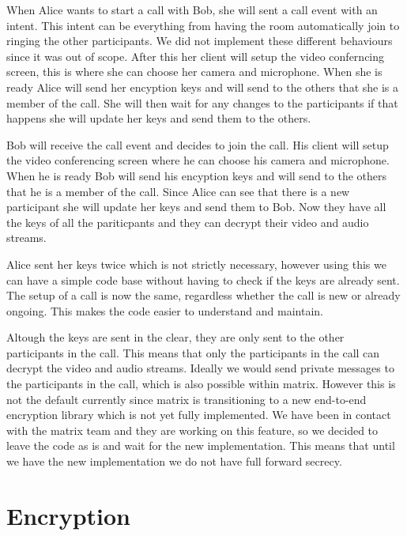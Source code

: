 \documentclass{report}
\begin{document}
    When Alice wants to start a call with Bob, she will sent a call event with an intent. This intent can be
    everything from having the room automatically join to ringing the other participants. We did not implement
    these different behaviours since it was out of scope. After this her client will setup the video conferncing
    screen, this is where she can choose her camera and microphone. When she is ready Alice will send her encyption
    keys and will send to the others that she is a member of the call. She will then wait for any changes to the participants
    if that happens she will update her keys and send them to the others.

    Bob will receive the call event and decides to join the call. His client will setup the video conferencing
    screen where he can choose his camera and microphone. When he is ready Bob will send his encyption keys and will
    send to the others that he is a member of the call. Since Alice can see that there is a new participant she will
    update her keys and send them to Bob. Now they have all the keys of all the pariticpants and they can decrypt their
    video and audio streams.

    Alice sent her keys twice which is not strictly necessary, however using this we can have a simple code base
    without having to check if the keys are already sent. The setup of a call is now the same, regardless whether
    the call is new or already ongoing. This makes the code easier to understand and maintain.

    Altough the keys are sent in the clear, they are only sent to the other participants in the call. This means that
    only the participants in the call can decrypt the video and audio streams. Ideally we would send private
    messages to the participants in the call, which is also possible within matrix. However this is not the default
    currently since matrix is transitioning to a new end-to-end encryption library which is not yet fully implemented.
    We have been in contact with the matrix team and they are working on this feature, so we decided to leave the code
    as is and wait for the new implementation. This means that until we have the new implementation we do not have
    full forward secrecy.



    \section{Encryption}
\end{document}
